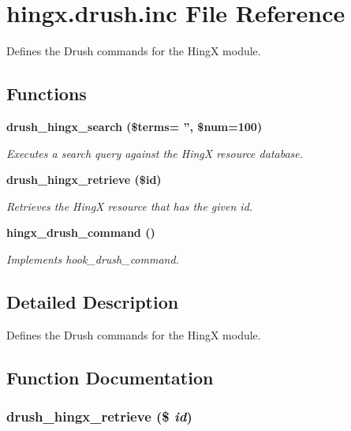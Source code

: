 \section{hingx.drush.inc File Reference}
\label{hingx_8drush_8inc}
Defines the Drush commands for the Hing\-X module. 

\subsection*{Functions}
\begin{CompactItemize}
\item 
\bf{drush\_\-hingx\_\-search} (\$terms= '', \$num=100)
\begin{CompactList}\small\item\em Executes a search query against the Hing\-X resource database. \item\end{CompactList}\item 
\bf{drush\_\-hingx\_\-retrieve} (\$id)
\begin{CompactList}\small\item\em Retrieves the Hing\-X resource that has the given id. \item\end{CompactList}\item 
\bf{hingx\_\-drush\_\-command} ()\label{hingx_8drush_8inc_ba3e6c9181cc4099d1eed7b9783cd904}

\begin{CompactList}\small\item\em Implements hook\_\-drush\_\-command. \item\end{CompactList}\end{CompactItemize}


\subsection{Detailed Description}
Defines the Drush commands for the Hing\-X module. 



\subsection{Function Documentation}
\subsubsection{\setlength{\rightskip}{0pt plus 5cm}drush\_\-hingx\_\-retrieve (\$ {\em id})}\label{hingx_8drush_8inc_85f4065e2ea9628e5630e3df38884928}


